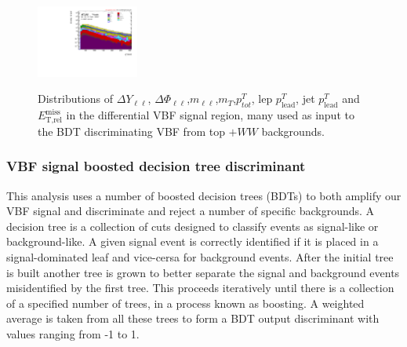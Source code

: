 \begin{figure}[!h]
{      \includegraphics[width=0.3\textwidth]{Pictures/run2-emme-CutVBFDYjjMin-leadLepPt-log.pdf}
  }\hfill
  \hfill
{\caption{Distributions of $\Delta Y_{\ell\ell}$, $\Delta \Phi_{\ell\ell}$,$m_{\ell\ell}$,$m_T$,$p^T_{tot}$, lep $p^T_{\text{lead}}$, jet $p^T_{\text{lead}}$ and $\ensuremath{E_{\text{T,rel}}^{\text{miss}}}$ in the differential VBF signal region, many used as input to the BDT discriminating VBF from top $+WW$ backgrounds.
\label{fig:signalregion}}}
\end{figure}

\subsubsection{VBF signal boosted decision tree discriminant}
This analysis uses a number of boosted decision trees (BDTs) to both amplify our VBF signal and discriminate and reject a number of specific backgrounds. A decision tree is a collection of cuts designed to classify events as signal-like or background-like. A given signal event is correctly identified if it is placed in a signal-dominated leaf and vice-cersa for background events. After the initial tree is built another tree is grown to better separate the signal and background events misidentified by the first tree. This proceeds iteratively until there is a collection of a specified number of trees, in a process known as boosting. A weighted average is taken from all these trees to form a BDT output discriminant with values ranging from -1 to 1.

